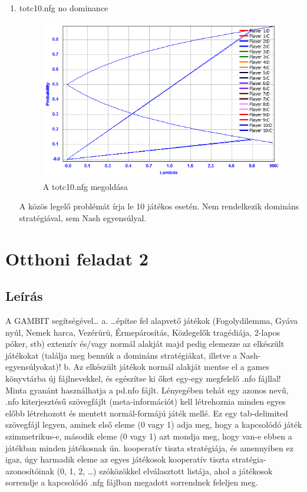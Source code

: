 \begin{enumerate}
\item totc10.nfg
		no dominance
		\begin{figure}[!h]
		\begin{center}
		\includegraphics[height=7cm]{figures/tot.png}
		\caption{A totc10.nfg megoldása}
		\end{center}
		\end{figure}
A közös legelő problémát írja le 10 játékos esetén. Nem rendelkezik domináns stratégiával, sem Nash egyensúlyal.
		
\end{enumerate}
\section{Otthoni feladat 2}
\subsection{Leírás}
A GAMBIT segítségével… a. …építse fel alapvető játékok (Fogolydilemma, Gyáva nyúl, Nemek harca, Vezérürü, Érmepárosítás, Közlegelők tragédiája, 2-lapos póker, stb) extenzív és/vagy normál alakját majd pedig elemezze az elkészült játékokat (találja meg bennük a domináns stratégiákat, illetve a Nash-egyensúlyokat)! b. Az elkészült játékok normál alakját mentse el a games könyvtárba új fájlnevekkel, és egészítse ki őket egy-egy megfelelő .nfo fájllal! Minta gyanánt használhatja a pd.nfo fájlt. Lényegében tehát egy azonos nevű, .nfo kiterjesztésű szövegfájlt (meta-információt) kell létrehoznia minden egyes előbb létrehozott és mentett normál-formájú játék mellé. Ez egy tab-delimited szövegfájl legyen, aminek első eleme (0 vagy 1) adja meg, hogy a kapcsolódó játék szimmetrikus-e, második eleme (0 vagy 1) azt mondja meg, hogy van-e ebben a játékban minden játékosnak ún. kooperatív tiszta stratégiája, és amennyiben ez igaz, úgy harmadik eleme az egyes játékosok kooperatív tiszta stratégia-azonosítóinak (0, 1, 2, …) szóközökkel elválasztott listája, ahol a játékosok sorrendje a kapcsolódó .nfg fájlban megadott sorrendnek feleljen meg.

